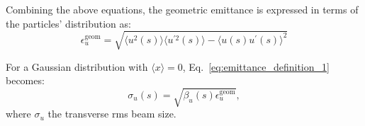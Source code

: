  Combining the above equations, the geometric emittance is expressed in terms of the particles' distribution as:
 \begin{equation}\label{eq:geometric_emittance_v2}
     \epsilon^{\mathrm{geom}}_u = \sqrt{\langle u^2(s) \rangle \langle u^{\prime 2}(s) \rangle- \langle u (s)u^{\prime}(s) \rangle ^2}
 \end{equation}
 
For a Gaussian distribution with $\langle x \rangle=0$, Eq.~\eqref{eq:emittance_definition_1} becomes: 
\begin{equation}
    \sigma_u(s) = \sqrt{\beta_u(s) \epsilon^{\mathrm{geom}}_u},
\end{equation}
where $\sigma_u$ the transverse rms beam size.



 
 
